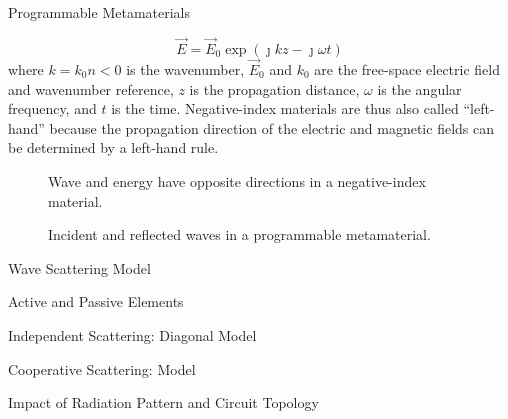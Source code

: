 \begin{section}{}
\begin{subsection}{Programmable Metamaterials}
\begin{itemize}
			\begin{equation}
				\vec{E} = \vec{E}_0 \exp(\jmath k z - \jmath \omega t)
			\end{equation}
			where $k = k_0 n < 0$ is the wavenumber, $\vec{E}_0$ and $k_0$ are the free-space electric field and wavenumber reference, $z$ is the propagation distance, $\omega$ is the angular frequency, and $t$ is the time.
			Negative-index materials are thus also called ``left-hand'' because the propagation direction of the electric and magnetic fields can be determined by a left-hand rule.
			\begin{figure}[H]
				\centering
				\resizebox{0.5\columnwidth}{!}{
					
				}
				\caption{Wave and energy have opposite directions in a negative-index material.}
				\label{fg:nim_flows}
			\end{figure}

		\end{itemize}

		\begin{figure}[H]
			\centering
			\caption{Incident and reflected waves in a programmable metamaterial.}
		\end{figure}
	\end{subsection}

	\begin{subsection}{Wave Scattering Model}
		\begin{subsubsection}{Active and Passive Elements}

		\end{subsubsection}

		\begin{subsubsection}{Independent Scattering: Diagonal Model}

		\end{subsubsection}

		\begin{subsubsection}{Cooperative Scattering:  Model}

		\end{subsubsection}

		\begin{subsubsection}{Impact of Radiation Pattern and Circuit Topology}

		\end{subsubsection}
	\end{subsection}

\end{section}

